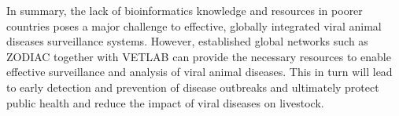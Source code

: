 In summary, the lack of bioinformatics knowledge and resources in poorer countries poses a major challenge to effective, globally integrated viral animal diseases surveillance systems. However, established global networks such as ZODIAC together with VETLAB can provide the necessary resources to enable effective surveillance and analysis of viral animal diseases. This in turn will lead to early detection and prevention of disease outbreaks and ultimately protect public health and reduce the impact of viral diseases on livestock.
